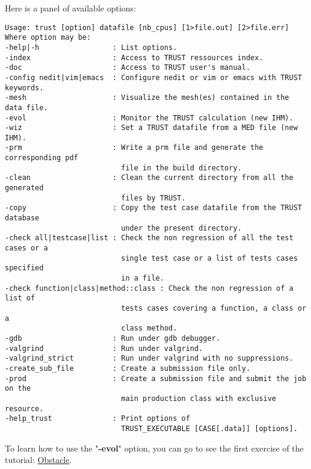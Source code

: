 Here is a panel of available options:
\begin{verbatim}
Usage: trust [option] datafile [nb_cpus] [1>file.out] [2>file.err]
Where option may be:
-help|-h                 : List options.
-index                   : Access to TRUST ressources index.
-doc                     : Access to TRUST user's manual.
-config nedit|vim|emacs  : Configure nedit or vim or emacs with TRUST keywords.
-mesh                    : Visualize the mesh(es) contained in the data file.
-evol                    : Monitor the TRUST calculation (new IHM).
-wiz                     : Set a TRUST datafile from a MED file (new IHM).
-prm                     : Write a prm file and generate the corresponding pdf 
                           file in the build directory.
-clean                   : Clean the current directory from all the generated 
                           files by TRUST.
-copy                    : Copy the test case datafile from the TRUST database 
                           under the present directory. 
-check all|testcase|list : Check the non regression of all the test cases or a 
                           single test case or a list of tests cases specified 
                           in a file.
-check function|class|method::class : Check the non regression of a list of
                           tests cases covering a function, a class or a 
                           class method.
-gdb                     : Run under gdb debugger.
-valgrind                : Run under valgrind.
-valgrind_strict         : Run under valgrind with no suppressions. 
-create_sub_file         : Create a submission file only. 
-prod                    : Create a submission file and submit the job on the 
                           main production class with exclusive resource. 
-help_trust              : Print options of 
                           TRUST_EXECUTABLE [CASE[.data]] [options]. 
\end{verbatim}


\vspace{0.5cm}
To learn how to use the "\textbf{-evol}" option, you can go to see the first exercise of the tutorial: \href{TRUST_tutorial.pdf\#exo1}{Obstacle}.

